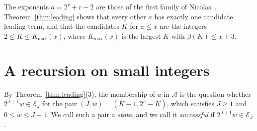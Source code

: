 \documentclass[11pt]{amsart}
\theoremstyle{definition}
\begin{document}
The exponents $a=2^r+r-2$ are those of the first family of Nicolas~\cite{nicolas2005open}. Theorem~\ref{thm:leading} shows that every other $a$ has exactly one candidate leading term, and that the candidates $K$ for $a\le x$ are the integers $2\le K\le K_{\max}(x)$, where $K_{\max}(x)$ is the largest $K$ with $\beta(K)\le x+3$.

\section{A recursion on small integers}
\label{sec:recursion}
By Theorem~\ref{thm:leading}(3), the membership of $a$ in $\mathcal{A}$ is the question whether $2^{J+1}w\in\mathcal{E}_J$ for the pair $(J,w)=(K-1,2^h-K)$, which satisfies $J\ge1$ and $0\le w\le J-1$. We call such a pair a \emph{state}, and we call it \emph{successful} if $2^{J+1}w\in\mathcal{E}_J$.
\end{document}
